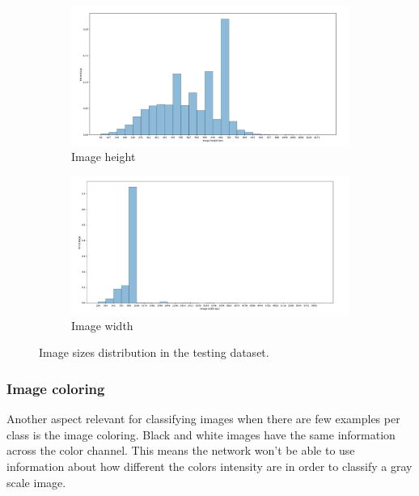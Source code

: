 \documentclass[12pt,
    brazil,			%
	english,        %
	]{article}
\begin{document}
\begin{figure}
    \centering
    \begin{subfigure}[b]{\textwidth}
        \includegraphics[width=\textwidth]{images/graphs/test-height-distribution.png}
        \caption{Image height}
    \end{subfigure}
    \hfill
    \begin{subfigure}[b]{\textwidth}
        \includegraphics[width=\textwidth]{images/graphs/test-width-distribution.png}
        \caption{Image width}
    \end{subfigure}
    \caption{Image sizes distribution in the testing dataset.}
    \label{fig:image-sizes:testing}
\end{figure}

\subsubsection{Image coloring}
\label{sec:image-coloring}
Another aspect relevant for classifying images when there are few examples per class is the image coloring. Black and white images have the same information across the color channel. This means the network won't be able to use information about how different the colors intensity are in order to classify a gray scale image.
\end{document}
